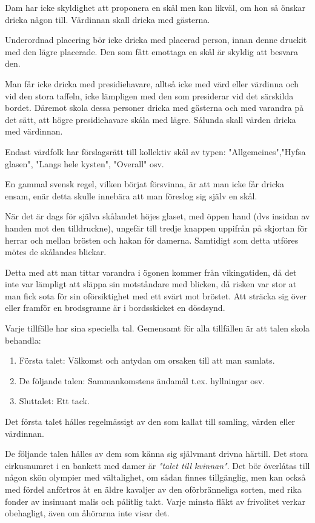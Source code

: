 Dam har icke skyldighet att proponera en skål men kan likväl, om hon så önskar dricka någon till. Värdinnan skall dricka med gästerna.

Underordnad placering bör icke dricka med placerad person, innan denne druckit med den lägre placerade. Den som fått emottaga en skål är skyldig att besvara den.

Man får icke dricka med presidiehavare, alltså icke med värd eller värdinna och vid den stora taffeln, icke lämpligen med den som presiderar vid det särskilda bordet. Däremot skola dessa personer dricka med gästerna och med varandra på det sätt, att högre presidiehavare skåla med lägre. Sålunda skall värden dricka med värdinnan.

Endast värdfolk har förslagsrätt till kollektiv skål av typen: "Allgemeines","Hyfsa glasen", "Langs hele kysten", "Overall" osv.

En gammal svensk regel, vilken börjat försvinna, är att man icke får dricka ensam, enär detta skulle innebära att man föreslog sig själv en skål.

När det är dags för själva skålandet höjes glaset, med öppen hand (dvs insidan av handen mot den tilldruckne), ungefär till tredje knappen uppifrån på skjortan för herrar och mellan brösten och hakan för damerna. Samtidigt som detta utföres mötes de skålandes blickar.

Detta med att man tittar varandra i ögonen kommer från vikingatiden, då det inte var lämpligt att släppa sin motståndare med blicken, då risken var stor at man fick sota för sin oförsiktighet med ett svärt mot bröstet. Att sträcka sig över eller framför en brodsgranne är i bordsskicket en dösdsynd.


Varje tillfälle har sina speciella tal. Gemensamt för alla tillfällen är att talen skola behandla:
\begin{enumerate}
    \item Första talet: Välkomst och antydan om orsaken till att man samlats.
    \item De följande talen: Sammankomstens ändamål t.ex. hyllningar osv.
    \item Sluttalet: Ett tack.
\end{enumerate}

Det första talet hålles regelmässigt av den som kallat till samling, värden eller värdinnan.

De följande talen hålles av dem som känna sig självmant drivna härtill. Det stora cirkusnumret i en bankett med damer är \textit{"talet till kvinnan"}. Det bör överlåtas till någon skön olympier med vältalighet, om sådan finnes tillgänglig, men kan också med fördel anförtros åt en äldre kavaljer av den oförbränneliga sorten, med rika fonder av insinuant malis och pålitlig takt. Varje minsta fläkt av frivolitet verkar obehagligt, även om åhörarna inte visar det.

